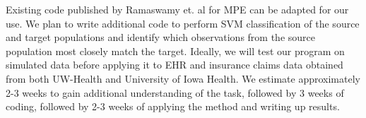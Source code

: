 \documentclass[12pt,preprint]{report}
\begin{document}
Existing code published by Ramaswamy et. al for MPE can be adapted for our use. We plan to write additional code to perform SVM classification of the source and target populations and identify which observations from the source population most closely match the target. Ideally, we will test our program on simulated data before applying it to EHR and insurance claims data obtained from both UW-Health and University of Iowa Health. We estimate approximately 2-3 weeks to gain additional understanding of the task, followed by 3 weeks of coding, followed by 2-3 weeks of applying the method and writing up results.
\end{document}
